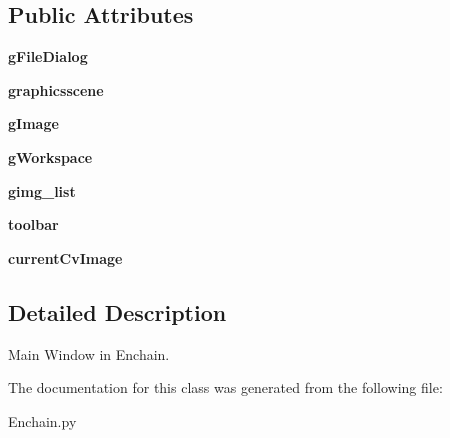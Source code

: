 \subsection*{Public Attributes}
\begin{DoxyCompactItemize}
\item 
{\bfseries g\+File\+Dialog}\hypertarget{classEnchain_1_1MainWindow_a6b064c306455fb22cfe36ca2a4cbef50}{}\label{classEnchain_1_1MainWindow_a6b064c306455fb22cfe36ca2a4cbef50}

\item 
{\bfseries graphicsscene}\hypertarget{classEnchain_1_1MainWindow_a495cb52577a0de4b0518e2c82983763b}{}\label{classEnchain_1_1MainWindow_a495cb52577a0de4b0518e2c82983763b}

\item 
{\bfseries g\+Image}\hypertarget{classEnchain_1_1MainWindow_af4d237944c77f0b279a95739118a798d}{}\label{classEnchain_1_1MainWindow_af4d237944c77f0b279a95739118a798d}

\item 
{\bfseries g\+Workspace}\hypertarget{classEnchain_1_1MainWindow_a5fa5344691aaa2321d61f2bcf3f0c45c}{}\label{classEnchain_1_1MainWindow_a5fa5344691aaa2321d61f2bcf3f0c45c}

\item 
{\bfseries gimg\+\_\+list}\hypertarget{classEnchain_1_1MainWindow_a56f665a73e8ff14e15b9a890e6ff3a9b}{}\label{classEnchain_1_1MainWindow_a56f665a73e8ff14e15b9a890e6ff3a9b}

\item 
{\bfseries toolbar}\hypertarget{classEnchain_1_1MainWindow_aecd85ebd3acb078fd4d949745570430a}{}\label{classEnchain_1_1MainWindow_aecd85ebd3acb078fd4d949745570430a}

\item 
{\bfseries current\+Cv\+Image}\hypertarget{classEnchain_1_1MainWindow_a8684ab62925b1f7b4392879495133fc6}{}\label{classEnchain_1_1MainWindow_a8684ab62925b1f7b4392879495133fc6}

\end{DoxyCompactItemize}


\subsection{Detailed Description}
\begin{DoxyVerb}Main Window in Enchain.
\end{DoxyVerb}
 

The documentation for this class was generated from the following file\+:\begin{DoxyCompactItemize}
\item 
Enchain.\+py\end{DoxyCompactItemize}
